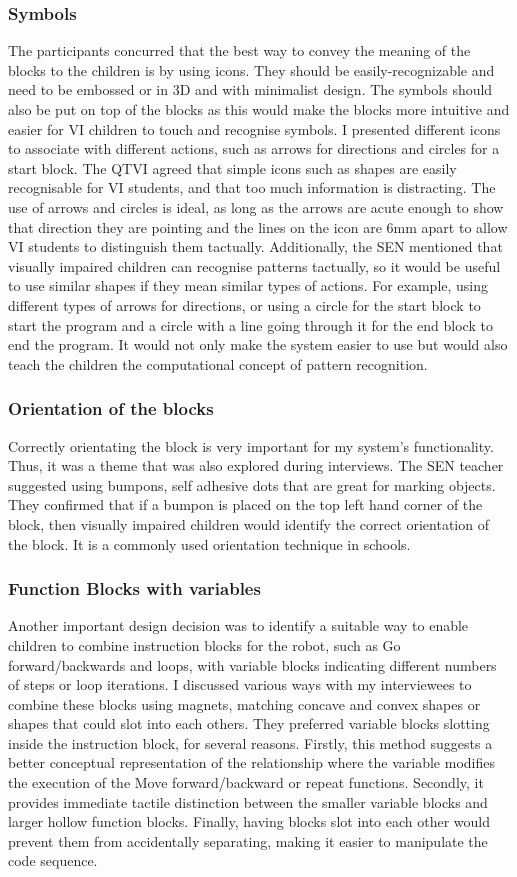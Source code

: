 \documentclass[oneside,%
                    author={Malak Hajji},
                    degree={BSc},
                    title={Designing An Accessible Computational Toolkit For Students},
                  subtitle={With Mixed Visual Abilities}]{dissertation}
\begin{document}
\subsubsection{Symbols}
The participants concurred that the best way to convey the meaning of the blocks to the children is by using icons. They should be easily-recognizable and need to be embossed or in 3D and with minimalist design. The symbols should also be put on top of the blocks as this would make the blocks more intuitive and easier for VI children to touch and recognise symbols.
I presented different icons to associate with different actions, such as arrows for directions and circles for a start block. The QTVI agreed that simple icons such as shapes are easily recognisable for VI students, and that too much information is distracting. The use of arrows and circles is ideal, as long as the arrows are acute enough to show that direction they are pointing and the lines on the icon are 6mm apart to allow VI students to distinguish them tactually. Additionally, the SEN mentioned that visually impaired children can recognise patterns tactually, so it would be useful to use similar shapes if they mean similar types of actions. For example, using different types of arrows for directions, or using a circle for the start block to start the program and a circle with a line going through it for the end block to end the program. It would not only make the system easier to use but would also teach the children the computational concept of pattern recognition.

\subsubsection{Orientation of the blocks}
Correctly orientating the block is very important for my system's functionality. Thus, it was a theme that was also explored during interviews. The SEN teacher suggested using bumpons, self adhesive dots that are great for marking objects. They confirmed that if a bumpon is placed on the top left hand corner of the block, then visually impaired children would identify the correct orientation of the block. It is a commonly used orientation technique in schools.
\subsubsection{Function Blocks with variables}
Another important design decision was to identify a suitable way to enable children to combine instruction blocks for the robot, such as Go forward/backwards and loops, with variable blocks indicating different numbers of steps or loop iterations. I discussed various ways with my interviewees to combine these blocks using magnets, matching concave and convex shapes or shapes that could slot into each others. They preferred variable blocks slotting inside the instruction block, for several reasons. Firstly, this method suggests a better conceptual representation of the relationship where the variable modifies the execution of the Move forward/backward or repeat functions. Secondly, it provides immediate tactile distinction between the smaller variable blocks and larger hollow function blocks. Finally, having blocks slot into each other would prevent them from accidentally separating, making it easier to manipulate the code sequence.
\end{document}
